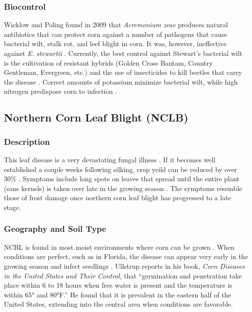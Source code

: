 \documentclass[12pt]{article}
\begin{document}
\subsubsection{Biocontrol}

Wicklow and Poling found in 2009 that \emph{Acremonium zeae} produces natural antibiotics that can protect corn against a number of pathogens that cause bacterial wilt, stalk rot, and leef blight in corn. It was, however, ineffective against \emph{E. stewartii} \autocite{wicklow2009antimicrobial}. Currently, the best control against Stewart's bacterial wilt is the cultivation of resistant hybrids (Golden Cross Bantam, Country Gentleman, Evergreen, etc.) and the use of insecticides to kill beetles that carry the disease \autocite{ullstrup1961corn}. Correct amounts of potassium minimize bacterial wilt, while high nitrogen predispose corn to infection \autocite{ullstrup1961corn}.


\subsection{Northern Corn Leaf Blight (NCLB)}

\subsubsection{Description}

This leaf disease is a very devastating fungal illness \autocite{zhang2021klebsiella}. If it becomes well established a couple weeks following silking, crop yeild can be reduced by over 30\% \autocite{ullstrup1961corn}. Symptoms include long spots on leaves that spread until the entire plant (sans kernels) is taken over late in the growing season \autocite{ullstrup1961corn}. The symptoms resemble those of frost damage once northern corn leaf blight has progressed to a late stage.

\subsubsection{Geography and Soil Type}

NCBL is found in most moist environments where corn can be grown \autocite{ullstrup1961corn}. When conditions are perfect, such as in Florida, the disease can appear very early in the growing season and infect seedlings \autocite{ullstrup1961corn}. Ullstrup reports in his book, \emph{Corn Diseases in the United States and Their Control}, that ``germination and penetration take place within 6 to 18 hours when free water is present and the temperature is within 65° and 80°F.'' He found that it is prevalent in the eastern half of the United States, extending into the central area when conditions are favorable.
\end{document}
